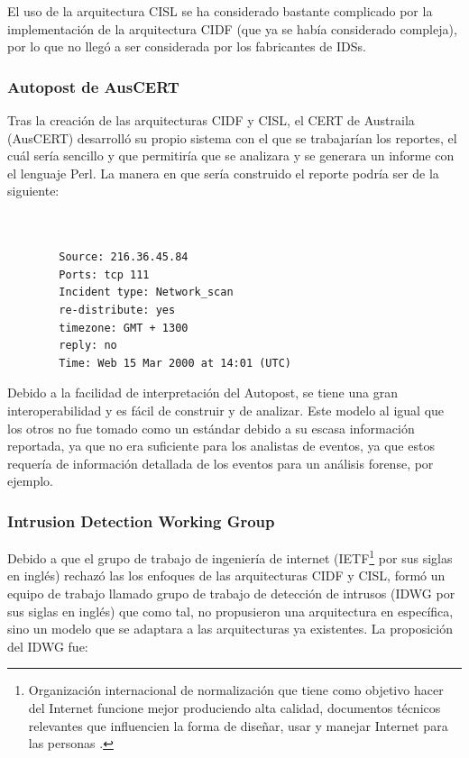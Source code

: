 	El uso de la arquitectura CISL se ha considerado bastante complicado por la implementación de la arquitectura CIDF (que ya se había considerado compleja), por lo que no llegó a ser considerada por los fabricantes de IDSs.\\
	
	
	\subsubsection{Autopost de AusCERT}
	
	Tras la creación de las arquitecturas CIDF y CISL, el CERT de Austraila (AusCERT) desarrolló su propio sistema con el que se trabajarían los reportes, el cuál sería sencillo y que permitiría que se analizara y se generara un informe con el lenguaje Perl. La manera en que sería construido el reporte podría ser de la siguiente: \\ \\ \\
	
	\begin{lstlisting}
		Source: 216.36.45.84
		Ports: tcp 111
		Incident type: Network_scan
		re-distribute: yes
		timezone: GMT + 1300
		reply: no
		Time: Web 15 Mar 2000 at 14:01 (UTC) 
	\end{lstlisting}
	
	
	Debido a la facilidad de interpretación del Autopost, se tiene una gran interoperabilidad y es fácil de construir y de analizar. Este modelo al igual que los otros no fue tomado como un estándar debido a su escasa información reportada, ya que no era suficiente para los analistas de eventos, ya que estos requería de información detallada de los eventos para un análisis forense, por ejemplo.\\
	
	
	\subsubsection{Intrusion Detection Working Group}
	
	Debido a que el grupo de trabajo de ingeniería de internet (IETF\footnote{Organización internacional de normalización que tiene como objetivo hacer del Internet funcione mejor produciendo alta calidad, documentos técnicos relevantes que influencien la forma de diseñar, usar y manejar Internet para las personas \cite{IEFT}.} por sus siglas en inglés) rechazó las los enfoques de las arquitecturas CIDF y CISL, formó un equipo de trabajo llamado grupo de trabajo de detección de intrusos (IDWG por sus siglas en inglés) que como tal, no propusieron una arquitectura en específica, sino un modelo que se adaptara a las arquitecturas ya existentes. La proposición del IDWG fue: \\
	
